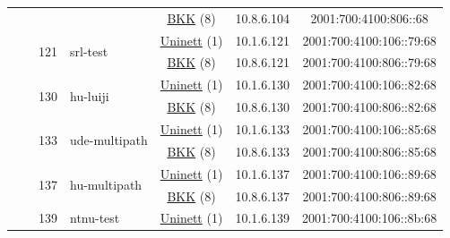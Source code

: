 \begin{small}
\begin{center}
\begin{longtable}{|c|c|c|c|c|c|c|c|}
  &  & \multicolumn{2}{|c|}{} & \multicolumn{2}{|c|}{\tiny{\href{http://bkk.no}{BKK} (8)}} & \tiny{10.8.6.104} & \tiny{2001:700:4100:806::68} \\* \cline{3-3}\cline{4-4}\cline{5-5}\cline{6-6}\cline{7-7}\cline{8-8}
  &  & \multirow{2}{*}{\tiny{121}} & \multicolumn{1}{|l|}{\multirow{2}{*}{\tiny{srl-test}}} & \multicolumn{2}{|c|}{\tiny{\href{https://www.uninett.no}{Uninett} (1)}} & \tiny{10.1.6.121} & \tiny{2001:700:4100:106::79:68} \\* \cline{5-5}\cline{6-6}\cline{7-7}\cline{8-8}
  &  &  &  & \multicolumn{2}{|c|}{\tiny{\href{http://bkk.no}{BKK} (8)}} & \tiny{10.8.6.121} & \tiny{2001:700:4100:806::79:68} \\* \cline{3-3}\cline{4-4}\cline{5-5}\cline{6-6}\cline{7-7}\cline{8-8}
  &  & \multirow{2}{*}{\tiny{130}} & \multicolumn{1}{|l|}{\multirow{2}{*}{\tiny{hu-luiji}}} & \multicolumn{2}{|c|}{\tiny{\href{https://www.uninett.no}{Uninett} (1)}} & \tiny{10.1.6.130} & \tiny{2001:700:4100:106::82:68} \\* \cline{5-5}\cline{6-6}\cline{7-7}\cline{8-8}
  &  &  &  & \multicolumn{2}{|c|}{\tiny{\href{http://bkk.no}{BKK} (8)}} & \tiny{10.8.6.130} & \tiny{2001:700:4100:806::82:68} \\* \cline{3-3}\cline{4-4}\cline{5-5}\cline{6-6}\cline{7-7}\cline{8-8}
  &  & \multirow{2}{*}{\tiny{133}} & \multicolumn{1}{|l|}{\multirow{2}{*}{\tiny{ude-multipath}}} & \multicolumn{2}{|c|}{\tiny{\href{https://www.uninett.no}{Uninett} (1)}} & \tiny{10.1.6.133} & \tiny{2001:700:4100:106::85:68} \\* \cline{5-5}\cline{6-6}\cline{7-7}\cline{8-8}
  &  &  &  & \multicolumn{2}{|c|}{\tiny{\href{http://bkk.no}{BKK} (8)}} & \tiny{10.8.6.133} & \tiny{2001:700:4100:806::85:68} \\* \cline{3-3}\cline{4-4}\cline{5-5}\cline{6-6}\cline{7-7}\cline{8-8}
  &  & \multirow{2}{*}{\tiny{137}} & \multicolumn{1}{|l|}{\multirow{2}{*}{\tiny{hu-multipath}}} & \multicolumn{2}{|c|}{\tiny{\href{https://www.uninett.no}{Uninett} (1)}} & \tiny{10.1.6.137} & \tiny{2001:700:4100:106::89:68} \\* \cline{5-5}\cline{6-6}\cline{7-7}\cline{8-8}
  &  &  &  & \multicolumn{2}{|c|}{\tiny{\href{http://bkk.no}{BKK} (8)}} & \tiny{10.8.6.137} & \tiny{2001:700:4100:806::89:68} \\* \cline{3-3}\cline{4-4}\cline{5-5}\cline{6-6}\cline{7-7}\cline{8-8}
  &  & \multirow{2}{*}{\tiny{139}} & \multicolumn{1}{|l|}{\multirow{2}{*}{\tiny{ntnu-test}}} & \multicolumn{2}{|c|}{\tiny{\href{https://www.uninett.no}{Uninett} (1)}} & \tiny{10.1.6.139} & \tiny{2001:700:4100:106::8b:68} \\* \cline{5-5}\cline{6-6}\cline{7-7}\cline{8-8}

\end{longtable}
\end{center}
\end{small}
